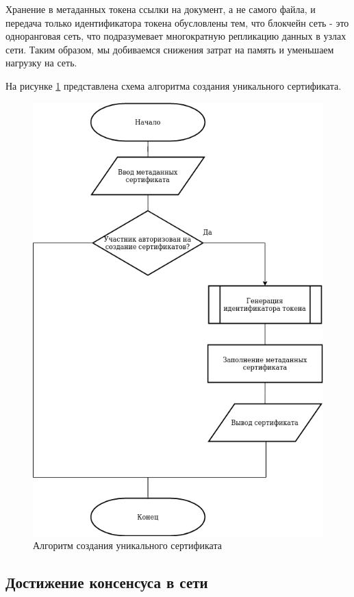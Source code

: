 Хранение в метаданных токена ссылки на документ, а не самого файла, и передача только идентификатора токена обусловлены тем, что блокчейн сеть - это одноранговая сеть, что подразумевает многократную репликацию данных в узлах сети. Таким образом, мы добиваемся снижения затрат на память и уменьшаем нагрузку на сеть.

На рисунке \ref{fig:a4} представлена схема алгоритма создания уникального сертификата.

\begin{figure}[hbtp]
	\centering
	\includegraphics[width=\textwidth - 30pt]{img/create_nft.png}
	\caption{Алгоритм создания уникального сертификата}
	\label{fig:a4}
\end{figure}


\subsection{Достижение консенсуса в сети}

